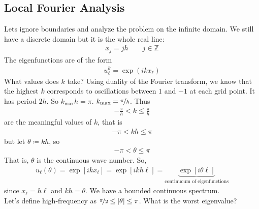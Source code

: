 \documentclass{article}
\begin{document}
        \subsection{Local Fourier Analysis}
            Lets ignore boundaries and analyze the problem on the infinite domain.  We still have a discrete domain but it is the whole real line:
            \begin{align}
                x_j = jh \qquad j \in \mathbb{Z}
            \end{align}
            The eigenfunctions are of the form
            \begin{align}
                u_\ell^k = \exp(ikx_\ell)
            \end{align}
            What values does $k$ take?  Using duality of the Fourier transform, we know that the highest $k$ corresponds to
            oscillations between $1$ and $-1$ at each grid point.  It has period $2h$.  So $k_\text{max}h = \pi$.  $k_\text{max} = \nicefrac{\pi}{h}$.  Thus
            \begin{align}
                -\frac{\pi}{h} < k \leq \frac{\pi}{h}
            \end{align}
            are the meaningful values of $k$, that is
            \begin{align}
                -\pi < kh \leq \pi
            \end{align}
            but let $\theta \coloneqq kh$, so
            \begin{align}
                -\pi < \theta \leq \pi
            \end{align}
            That is, $\theta$ is the continuous wave number.  So,
            \begin{align}
                u_\ell(\theta) = \exp[ikx_\ell] = \exp[ikh\ell] = \underbrace{\exp[i\theta\ell]}_\text{continuoum of eigenfunctions}
            \end{align}
            since $x_\ell = h\ell$ and $kh = \theta$.  We have a bounded continuous spectrum. \\

            Let's define high-frequency as $\nicefrac{\pi}{2} \leq \abs{\theta} \leq \pi$.  What is the worst eigenvalue? \\
\end{document}
